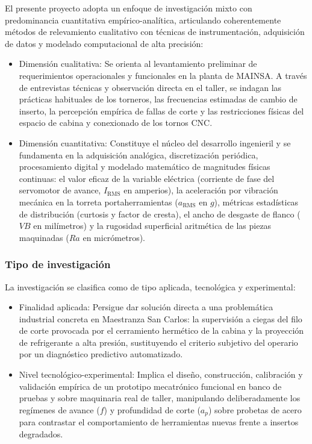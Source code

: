 El presente proyecto adopta un enfoque de investigación mixto con predominancia cuantitativa empírico-analítica, articulando coherentemente métodos de relevamiento cualitativo con técnicas de instrumentación, adquisición de datos y modelado computacional de alta precisión:
\begin{itemize}
    \item Dimensión cualitativa: Se orienta al levantamiento preliminar de requerimientos operacionales y funcionales en la planta de MAINSA. A través de entrevistas técnicas y observación directa en el taller, se indagan las prácticas habituales de los torneros, las frecuencias estimadas de cambio de inserto, la percepción empírica de fallas de corte y las restricciones físicas del espacio de cabina y conexionado de los tornos CNC.
    \item Dimensión cuantitativa: Constituye el núcleo del desarrollo ingenieril y se fundamenta en la adquisición analógica, discretización periódica, procesamiento digital y modelado matemático de magnitudes físicas continuas: el valor eficaz de la variable eléctrica (corriente de fase del servomotor de avance, $I_{\text{RMS}}$ en amperios), la aceleración por vibración mecánica en la torreta portaherramientas ($a_{\text{RMS}}$ en $g$), métricas estadísticas de distribución (curtosis y factor de cresta), el ancho de desgaste de flanco ($VB$ en milímetros) y la rugosidad superficial aritmética de las piezas maquinadas ($Ra$ en micrómetros).
\end{itemize}

\subsubsection{Tipo de investigación}
\label{subsubsec:tipo_investigacion}

La investigación se clasifica como de tipo aplicada, tecnológica y experimental:
\begin{itemize}
    \item Finalidad aplicada: Persigue dar solución directa a una problemática industrial concreta en Maestranza San Carlos: la supervisión a ciegas del filo de corte provocada por el cerramiento hermético de la cabina y la proyección de refrigerante a alta presión, sustituyendo el criterio subjetivo del operario por un diagnóstico predictivo automatizado.
    \item Nivel tecnológico-experimental: Implica el diseño, construcción, calibración y validación empírica de un prototipo mecatrónico funcional en banco de pruebas y sobre maquinaria real de taller, manipulando deliberadamente los regímenes de avance ($f$) y profundidad de corte ($a_p$) sobre probetas de acero para contrastar el comportamiento de herramientas nuevas frente a insertos degradados.
\end{itemize}

